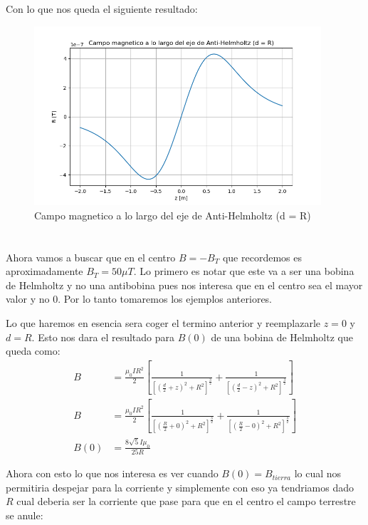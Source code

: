 \documentclass{report}
\begin{document}
Con lo que nos queda el siguiente resultado:
\begin{figure}[H]
	\begin{center}
		\includegraphics[width=0.95\textwidth]{img/punto_12_e.png}
	\end{center}
	\caption{Campo magnetico a lo largo del eje de Anti-Helmholtz (d = R)}\label{fig:}
\end{figure}

\section{}

Ahora vamos a buscar que en el centro $ B = - B_T$ que recordemos es aproximadamente $B_T = 50 \mu T$. Lo primero es notar que este va a ser una bobina de Helmholtz y no una antibobina pues nos interesa que en el centro sea el mayor valor y no $0$. Por lo tanto tomaremos los ejemplos anteriores.

Lo que haremos en esencia sera coger el termino anterior y reemplazarle $z = 0$ y $d = R$. Esto nos dara el resultado para $B(0)$ de una bobina de Helmholtz que queda como:
\begin{align*}
	B & = \frac{\mu_0 I R^2}{2} \left[\frac{1}{\left[ \left(\frac{d}{2} + z\right)^2 + R^2\right]^{\frac{3}{2}}} + \frac{1}{\left[ \left(\frac{d}{2} - z\right)^2 + R^2\right]^{\frac{3}{2}}}\right]\\
	B & = \frac{\mu_0 I R^2}{2} \left[\frac{1}{\left[ \left(\frac{R}{2} + 0\right)^2 + R^2\right]^{\frac{3}{2}}} + \frac{1}{\left[ \left(\frac{R}{2} - 0\right)^2 + R^2\right]^{\frac{3}{2}}}\right]\\
	B(0) &= \frac{8 \sqrt{5} I \mu_{0}}{25 R}
\end{align*}

Ahora con esto lo que nos interesa es ver cuando $B(0) = B_{tierra}$ lo cual nos permitiria despejar para la corriente y simplemente con eso ya tendriamos dado $R$ cual deberia ser la corriente que pase para que en el centro el campo terrestre se anule:
\end{document}
